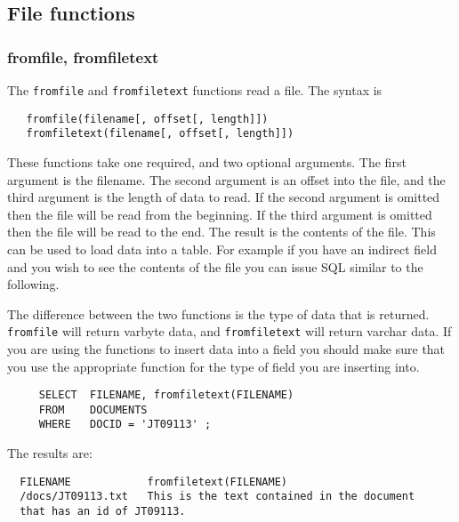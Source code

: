 \subsection{File functions}

\subsubsection{fromfile, fromfiletext}

The \verb`fromfile` and \verb`fromfiletext` functions read a file.
The syntax is
\begin{verbatim}
   fromfile(filename[, offset[, length]])
   fromfiletext(filename[, offset[, length]])
\end{verbatim}

These functions take one required, and two optional arguments.  The
first argument is the filename.  The second argument is an offset into
the file, and the third argument is the length of data to read.  If the
second argument is omitted then the file will be read from the
beginning.  If the third argument is omitted then the file will be read
to the end.  The result is the contents of the file.  This can be used
to load data into a table.  For example if you have an indirect field
and you wish to see the contents of the file you can issue SQL similar
to the following.

The difference between the two functions is the type of data that is
returned.  \verb`fromfile` will return varbyte data, and
\verb`fromfiletext` will return varchar data.  If you are using the
functions to insert data into a field you should make sure that you
use the appropriate function for the type of field you are inserting
into.

\begin{verbatim}
     SELECT  FILENAME, fromfiletext(FILENAME)
     FROM    DOCUMENTS
     WHERE   DOCID = 'JT09113' ;
\end{verbatim}

The results are:

\begin{screen}
\begin{verbatim}
  FILENAME            fromfiletext(FILENAME)
  /docs/JT09113.txt   This is the text contained in the document
  that has an id of JT09113.
\end{verbatim}
\end{screen}

